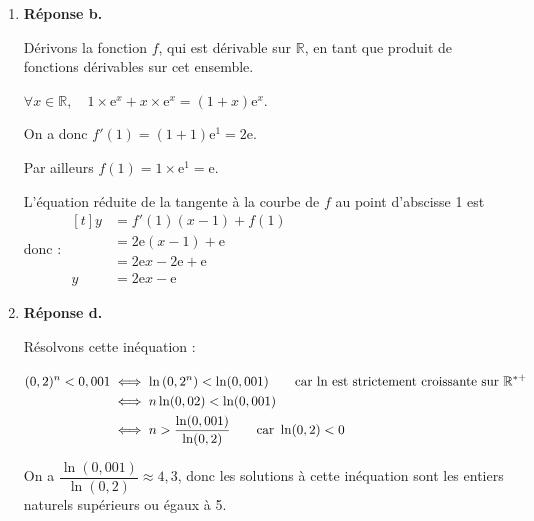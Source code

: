 \documentclass[10pt]{article}
\providecommand{\R}{\mathbb{R}}
\begin{document}
\begin{enumerate}
			On dérive la proposition, en pensant bien à utiliser la formule pour dériver une fonction composée ($x\longmapsto H(2x)$ a pour dérivée $x \longmapsto 2H'(2x)$) et on vérifie.

			Si $K_\textbf{c} : x \longmapsto \dfrac{1}{2} H(2x)$, alors,

			$\forall x \in \R, K_\textbf{c}' (x) = \dfrac{1}{2}\times 2H'(2x) = H'(2x) = h(2x)$, car $H$ est une primitive de $h$ sur $\R$

			et donc on a : $\forall x \in \R, K_\textbf{c}' (x) = k(x)$.

			On en déduit donc que $K_\textbf{c}$ est une primitive de $k$ sur $\R$.

			\item \textbf{Réponse b.}

			Dérivons la fonction $f$, qui est dérivable sur $\R$, en tant que produit de fonctions dérivables sur cet ensemble.

			$\forall x \in \R, \quad 1 \times \mathrm{e}^x + x \times \mathrm{e}^x = (1 + x)\mathrm{e}^x$.

			On a donc $f'(1) = (1 + 1)\mathrm{e}^1 = 2\mathrm{e}$.

			Par ailleurs $f(1) = 1\times \mathrm{e}^1 = \mathrm{e}$.

			L'équation réduite de la tangente à la courbe de $f$ au point d'abscisse 1 est donc :
			$\begin{aligned}[t] y &= f'(1) (x - 1) + f(1)\\ &= 2\mathrm{e} (x - 1) + \mathrm{e} \\&= 2\mathrm{e}x - 2\mathrm{e} + \mathrm{e} \\y&= 2\mathrm{e}x - \mathrm{e}\end{aligned}$

			\item \textbf{Réponse d.}

			Résolvons cette inéquation :

			$ \begin{aligned} [t] (0,2)^n < 0,001 &\iff \ln\left(0,2^n\right) < \ln(0,001) \text{\qquad car ln est strictement croissante sur }\R^{*+}\\
			&\iff n\ln(0,02) < \ln(0,001)\\
			&\iff n > \dfrac{\ln(0,001)}{\ln(0,2)} \text{\qquad car } \ln(0,2)< 0
			\end{aligned}$

			On a $\dfrac{\ln(0,001)}{\ln(0,2)} \approx 4,3$, donc les solutions à cette inéquation sont les entiers naturels supérieurs ou égaux à 5.
		\end{enumerate}

\bigskip
\end{document}
